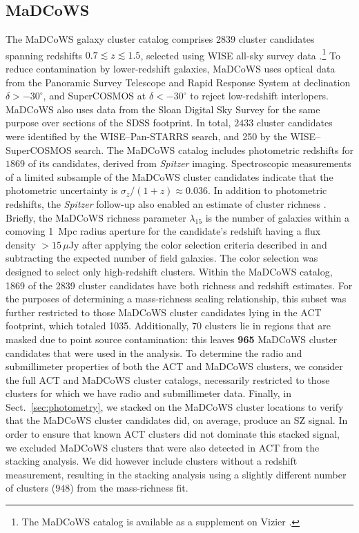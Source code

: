 \documentclass[longauth]{aa} %
\begin{document}
\subsection{MaDCoWS}\label{sec:data:madcows}

The MaDCoWS galaxy cluster catalog comprises 2839 cluster candidates spanning redshifts $0.7 \lesssim z \lesssim 1.5$, selected using WISE \citep{Wright2010} all-sky survey data \citep{Gonzalez2019}.\footnote{The MaDCoWS catalog is available as a supplement on Vizier \citep{Gonzalez2019catalog}.}  To reduce contamination by lower-redshift galaxies, MaDCoWS uses optical data from the Panoramic Survey Telescope and Rapid Response System \citep[Pan-STARRS;][]{Chambers2016} at declination $\delta > -30^\circ$, and SuperCOSMOS \citep{Hambly2001c, Hambly2001b,Hambly2001a} at $\delta < -30^\circ$ to reject low-redshift interlopers. MaDCoWS also uses data from the Sloan Digital Sky Survey \citep[SDSS]{York2000} for the same purpose over sections of the SDSS footprint. In total, $2433$ cluster candidates were identified by the WISE--Pan-STARRS search, and 250 by the WISE--SuperCOSMOS search. The MaDCoWS catalog includes photometric redshifts for $1869$ of its candidates, derived from \textit{Spitzer} imaging. Spectroscopic measurements of a limited subsample of the MaDCoWS cluster candidates indicate that the photometric uncertainty is $\sigma_{z} / (1+z) \approx 0.036$. In addition to photometric redshifts, the \textit{Spitzer} follow-up also enabled an estimate of cluster richness \citep[{$\lambda_{15}$}; see Sect. $6.3$ of][]{Gonzalez2019}. Briefly, the MaDCoWS richness parameter $\lambda_{15}$ is the number of galaxies within a comoving 1~Mpc radius aperture for the candidate's redshift having a flux density $> 15\,\mu$Jy after applying the color selection criteria described in \cite{Wylezalek2013} and subtracting the expected number of field galaxies. The color selection was designed to select only high-redshift clusters.
Within the MaDCoWS catalog,  1869 of the 2839 cluster candidates have both richness and redshift estimates.  For the purposes of determining a mass-richness scaling relationship, this subset was further restricted to those MaDCoWS cluster candidates lying in the ACT footprint, which totaled 1035. Additionally, 70 clusters lie in regions that are masked due to point source contamination: this leaves {\bf 965} MaDCoWS cluster candidates that were used in the analysis. To determine the radio and submillimeter properties of both the ACT and MaDCoWS clusters, we consider the full ACT and MaDCoWS cluster catalogs, necessarily restricted to those clusters for which we have radio and submillimeter data. Finally, in Sect.~\ref{sec:photometry}, we stacked on the MaDCoWS cluster locations to verify that the MaDCoWS cluster candidates did, on average, produce an SZ signal. In order to ensure that known ACT clusters did not dominate this stacked signal, we excluded MaDCoWS clusters that were also detected in ACT from the stacking analysis. We did however include clusters without a redshift measurement, resulting in the stacking analysis using a slightly different number of clusters ($948$) from the mass-richness fit.
\end{document}
